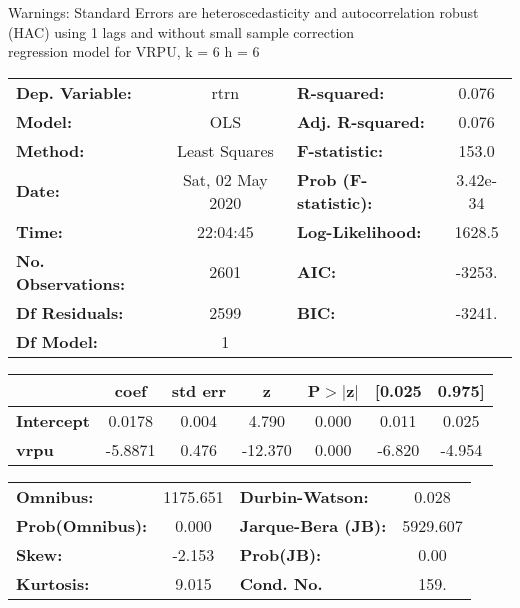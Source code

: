 Warnings: \newline
 [1] Standard Errors are heteroscedasticity and autocorrelation robust (HAC) using 1 lags and without small sample correction\\ 

regression model for VRPU, k = 6 h = 6\begin{center}
\begin{tabular}{lclc}
\toprule
\textbf{Dep. Variable:}    &       rtrn       & \textbf{  R-squared:         } &     0.076   \\
\textbf{Model:}            &       OLS        & \textbf{  Adj. R-squared:    } &     0.076   \\
\textbf{Method:}           &  Least Squares   & \textbf{  F-statistic:       } &     153.0   \\
\textbf{Date:}             & Sat, 02 May 2020 & \textbf{  Prob (F-statistic):} &  3.42e-34   \\
\textbf{Time:}             &     22:04:45     & \textbf{  Log-Likelihood:    } &    1628.5   \\
\textbf{No. Observations:} &        2601      & \textbf{  AIC:               } &    -3253.   \\
\textbf{Df Residuals:}     &        2599      & \textbf{  BIC:               } &    -3241.   \\
\textbf{Df Model:}         &           1      & \textbf{                     } &             \\
\bottomrule
\end{tabular}
\begin{tabular}{lcccccc}
                   & \textbf{coef} & \textbf{std err} & \textbf{z} & \textbf{P$> |$z$|$} & \textbf{[0.025} & \textbf{0.975]}  \\
\midrule
\textbf{Intercept} &       0.0178  &        0.004     &     4.790  &         0.000        &        0.011    &        0.025     \\
\textbf{vrpu}      &      -5.8871  &        0.476     &   -12.370  &         0.000        &       -6.820    &       -4.954     \\
\bottomrule
\end{tabular}
\begin{tabular}{lclc}
\textbf{Omnibus:}       & 1175.651 & \textbf{  Durbin-Watson:     } &    0.028  \\
\textbf{Prob(Omnibus):} &   0.000  & \textbf{  Jarque-Bera (JB):  } & 5929.607  \\
\textbf{Skew:}          &  -2.153  & \textbf{  Prob(JB):          } &     0.00  \\
\textbf{Kurtosis:}      &   9.015  & \textbf{  Cond. No.          } &     159.  \\
\bottomrule
\end{tabular}
\end{center}

